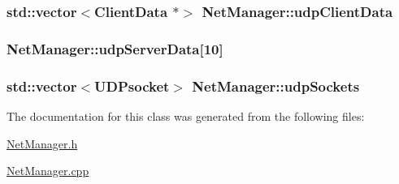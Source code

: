 \hypertarget{classNetManager_a687d70a4e199c2cbe4cb955a2cd94b04}{
\subsubsection[{udp\-Client\-Data}]{\setlength{\rightskip}{0pt plus 5cm}std\-::vector$<${\bf Client\-Data} $\ast$$>$ Net\-Manager\-::udp\-Client\-Data}}\label{classNetManager_a687d70a4e199c2cbe4cb955a2cd94b04}
\hypertarget{classNetManager_a05e52422c7190259dfb9bbaa6fe7fed5}{
\subsubsection[{udp\-Server\-Data}]{ Net\-Manager\-::udp\-Server\-Data\mbox{[}10\mbox{]}}}\label{classNetManager_a05e52422c7190259dfb9bbaa6fe7fed5}
\hypertarget{classNetManager_aa99d99b6fa90707d9101c4e1a1835018}{
\subsubsection[{udp\-Sockets}]{\setlength{\rightskip}{0pt plus 5cm}std\-::vector$<$U\-D\-Psocket$>$ Net\-Manager\-::udp\-Sockets\hspace{0.3cm}{\ttfamily [private]}}}\label{classNetManager_aa99d99b6fa90707d9101c4e1a1835018}


The documentation for this class was generated from the following files\-:\begin{DoxyCompactItemize}
\item 
\hyperlink{NetManager_8h}{Net\-Manager.\-h}\item 
\hyperlink{NetManager_8cpp}{Net\-Manager.\-cpp}\end{DoxyCompactItemize}
